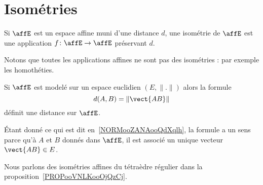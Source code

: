 \section{Isométries}

\begin{definition}       \label{DEFooZGKBooGgjkgs}
     Si \( \affE\) est un espace affine muni d'une distance \( d\), une isométrie de \( \affE\) est une application \( f\colon \affE\to \affE\) préservant \( d\).
\end{definition}
Notons que toutes les applications affines ne sont pas des isométries : par exemple les homothéties.

Si \( \affE\) est modelé sur un espace euclidien \( (E,\| . \|)\) alors la formule
\begin{equation}
    d(A,B)=\| \vect{ AB } \|
\end{equation}
définit une distance sur \( \affE\).

Étant donné ce qui est dit en~\ref{NORMooZANAooQdXqlh}, la formule a un sens parce qu'à \( A\) et \( B\) donnés dans \( \affE\), il est associé un unique vecteur \( \vect{ AB }\in E\).

Nous parlons des isométries affines du tétraèdre régulier dans la proposition~\ref{PROPooVNLKooOjQzCj}.
